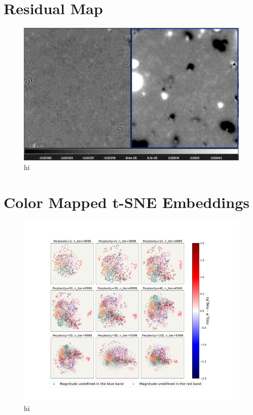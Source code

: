 \section{Residual Map}

\begin{figure}[h!]
    \centering
    \includegraphics[scale=0.5]{Code/Saved_Figures/comparing residual map.png}
    \caption{hi}
    \label{Comparing_residual_maps}
\end{figure}

\newpage
\section{Color Mapped t-SNE Embeddings}

\begin{figure}[h!]
    \centering
    \includegraphics[trim={5cm 3cm 5cm 3cm},clip,width=\textwidth]{Code/Saved_Figures/peplex_H_Ks.pdf}
    \caption{hi}
    \label{embeddding_H_ks}
\end{figure}

